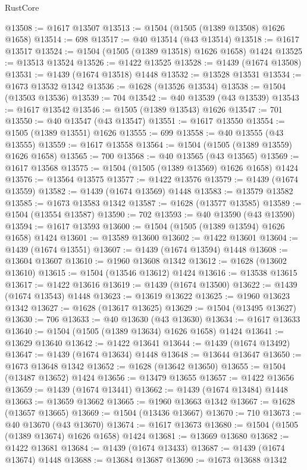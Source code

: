 \begin{lexlean}{RustCore}
\begin{coremodule}
@13508 := @1617 @13507
@13513 := @1504 (@1505 (@1389 @13508) @1626 @1658)
@13514 := 698
@13517 := @40 @13514 (@43 @13514)
@13518 := @1617 @13517
@13524 := @1504 (@1505 (@1389 @13518) @1626 @1658) @1424
@13525 := @13513 @13524
@13526 := @1422 @13525
@13528 := @1439 (@1674 @13508)
@13531 := @1439 (@1674 @13518) @1448
@13532 := @13528 @13531
@13534 := @1673 @13532 @1342
@13536 := @1628 (@13526 @13534)
@13538 := @1504 (@13503 @13536)
@13539 := 704
@13542 := @40 @13539 (@43 @13539)
@13543 := @1617 @13542
@13546 := @1505 (@1389 @13543) @1626
@13547 := 701
@13550 := @40 @13547 (@43 @13547)
@13551 := @1617 @13550
@13554 := @1505 (@1389 @13551) @1626
@13555 := 699
@13558 := @40 @13555 (@43 @13555)
@13559 := @1617 @13558
@13564 := @1504 (@1505 (@1389 @13559) @1626 @1658)
@13565 := 700
@13568 := @40 @13565 (@43 @13565)
@13569 := @1617 @13568
@13575 := @1504 (@1505 (@1389 @13569) @1626 @1658) @1424
@13576 := @13564 @13575
@13577 := @1422 @13576
@13579 := @1439 (@1674 @13559)
@13582 := @1439 (@1674 @13569) @1448
@13583 := @13579 @13582
@13585 := @1673 @13583 @1342
@13587 := @1628 (@13577 @13585)
@13589 := @1504 (@13554 @13587)
@13590 := 702
@13593 := @40 @13590 (@43 @13590)
@13594 := @1617 @13593
@13600 := @1504 (@1505 (@1389 @13594) @1626 @1658) @1424
@13601 := @13589 @13600
@13602 := @1422 @13601
@13604 := @1439 (@1674 @13551)
@13607 := @1439 (@1674 @13594) @1448
@13608 := @13604 @13607
@13610 := @1960 @13608 @1342
@13612 := @1628 (@13602 @13610)
@13615 := @1504 (@13546 @13612) @1424
@13616 := @13538 @13615
@13617 := @1422 @13616
@13619 := @1439 (@1674 @13500)
@13622 := @1439 (@1674 @13543) @1448
@13623 := @13619 @13622
@13625 := @1960 @13623 @1342
@13627 := @1628 (@13617 @13625)
@13629 := @1504 (@13495 @13627)
@13630 := 706
@13633 := @40 @13630 (@43 @13630)
@13634 := @1617 @13633
@13640 := @1504 (@1505 (@1389 @13634) @1626 @1658) @1424
@13641 := @13629 @13640
@13642 := @1422 @13641
@13644 := @1439 (@1674 @13492)
@13647 := @1439 (@1674 @13634) @1448
@13648 := @13644 @13647
@13650 := @1673 @13648 @1342
@13652 := @1628 (@13642 @13650)
@13655 := @1504 (@13487 @13652) @1424
@13656 := @13479 @13655
@13657 := @1422 @13656
@13659 := @1439 (@1674 @13441)
@13662 := @1439 (@1674 @13484) @1448
@13663 := @13659 @13662
@13665 := @1960 @13663 @1342
@13667 := @1628 (@13657 @13665)
@13669 := @1504 (@13436 @13667)
@13670 := 710
@13673 := @40 @13670 (@43 @13670)
@13674 := @1617 @13673
@13680 := @1504 (@1505 (@1389 @13674) @1626 @1658) @1424
@13681 := @13669 @13680
@13682 := @1422 @13681
@13684 := @1439 (@1674 @13433)
@13687 := @1439 (@1674 @13674) @1448
@13688 := @13684 @13687
@13690 := @1673 @13688 @1342

\end{coremodule}
\end{lexlean}
